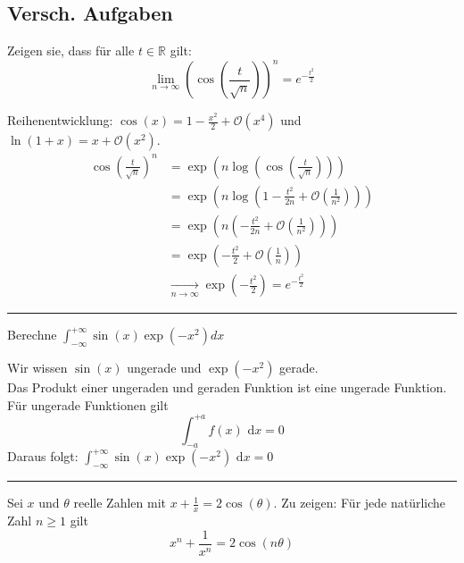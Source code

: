\documentclass[a4paper,fontsize = 7pt]{scrartcl}
\def\R{\mathbb{R}}
\def\dx{\text{ d}x}
\def\oof{\mathcal{O}}
\begin{document}
\subsection{Versch. Aufgaben}%


	Zeigen sie, dass für alle $t \in \R$ gilt:
	\begin{equation*}
		\lim_{n \to \infty} \left( \cos \left( \frac{t}{\sqrt{n}} \right) \right)^n = e^{-\frac{t^2}{2}}
	\end{equation*}
	
	Reihenentwicklung: $\cos (x) = 1 - \frac{x^2}{2} + \oof \left(x^4 \right)$ und\\$\ln (1+x) = x + \oof \left(x^2 \right)$.
	\begin{align*}
	\cos \left( \frac{t}{\sqrt{n}} \right)^n &= \exp \left( n \log \left( \cos \left( \frac{t}{\sqrt{n}}  \right) \right) \right)\\ 
						 &= \exp \left( n \log \left( 1 - \frac{t^2}{2n} + \oof \left( \frac{1}{n^2} \right) \right) \right)\\
						 &= \exp \left( n \left( - \frac{t^2}{2n} + \oof \left( \frac{1}{n^2} \right) \right) \right)\\
						 &= \exp \left( - \frac{t^2}{2} + \oof \left( \frac{1}{n} \right) \right)\\
						 & \underset{n \to \infty}{\longrightarrow} \exp \left( - \frac{t^2}{2} \right) = e^{-\frac{t^2}{2}}
	\end{align*}

\vspace{0.1 cm}
\hrule
\vspace{0.2 cm}


  Berechne $\int_{-\infty}^{+\infty} \sin(x)\exp\left(-x^2\right) dx$
	
	Wir wissen $\sin(x)$ ungerade und $\exp\left(-x^2\right)$ gerade.
	\\Das Produkt einer ungeraden und geraden Funktion ist eine ungerade Funktion.\\
	Für ungerade Funktionen gilt $$\int_{-a}^{+a} f(x) \dx = 0$$ Daraus folgt: 
	$\int_{-\infty}^{+\infty} \sin(x)\exp\left(-x^2\right) \dx = 0$

\vspace{0.1 cm}
\hrule
\vspace{0.2 cm}


  Sei $x$ und $\theta$ reelle Zahlen mit $x + \frac{1}{x} = 2 \cos(\theta)$.
	Zu zeigen: Für jede natürliche Zahl $n \geq 1$ gilt
	\begin{equation*}
		x^n + \frac{1}{x^n} = 2 \cos (n \theta)
	\end{equation*}
	
\end{document}
